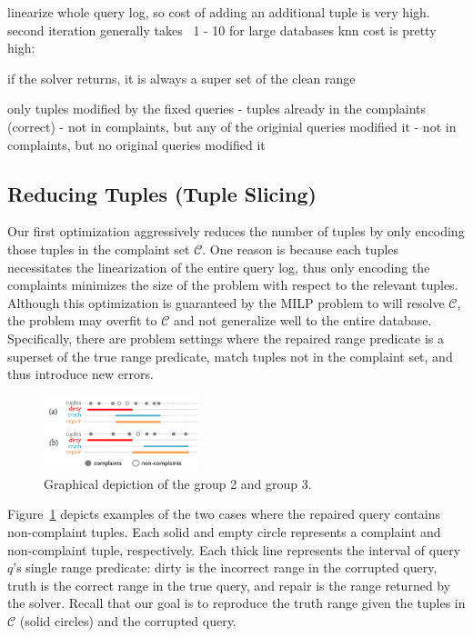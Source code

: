 linearize whole query log, so cost of adding an additional tuple is very high.
second iteration generally takes ~1 - 10%
for large databases knn cost is pretty high: ~

if the solver returns, it is always a super set of the clean range

only tuples modified by the fixed queries
- tuples already in the complaints (correct)
- not in complaints, but any of the originial queries modified it
- not in complaints, but no original queries modified it
\fi



\subsection{Reducing Tuples (Tuple Slicing)}
\label{sec:opt:tbsize}


Our first optimization aggressively reduces the number of tuples by only encoding those 
tuples in the complaint set $\mathcal{C}$.  One reason is because each tuples necessitates
the linearization of the entire query log, thus only encoding the complaints minimizes the 
size of the problem with respect to the relevant tuples.
Although this optimization is guaranteed by the MILP problem to 
will resolve $\mathcal{C}$, the problem may overfit to $\mathcal{C}$ 
and not generalize well to the entire database.
Specifically, there are problem settings where the repaired range predicate is a superset of 
the true range predicate, match tuples not in the complaint set, and thus introduce new errors.    

\begin{figure}[t]
    \centering
    \includegraphics[width=0.4\textwidth]{figures/2nditerationgroups}
    \caption{Graphical depiction of the group 2 and group 3. }
    \label{fig:groups}
\end{figure}

Figure~\ref{fig:groups} depicts examples of the two cases where the repaired query contains non-complaint tuples.
Each solid and empty circle represents a complaint and non-complaint tuple, respectively.
Each thick line represents the interval of query $q$'s single range predicate: 
dirty is the incorrect range in the corrupted query,
truth is the correct range in the true query, 
and repair is the range returned by the solver.
Recall that our goal is to reproduce the truth range given the tuples in $\mathcal{C}$ (solid circles)
and the corrupted query.

